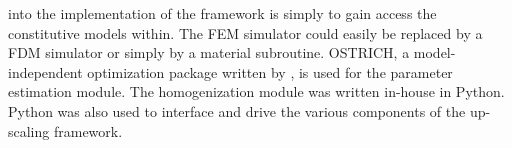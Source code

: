 into the implementation of the framework is simply to gain access the constitutive models within.  The FEM simulator could easily be replaced by a FDM simulator or simply by a material subroutine.  OSTRICH, a model-independent optimization package written by \citet{matott_ostrich:_2016}, is used for the parameter estimation module. The homogenization module was written in-house in Python. Python was also used to interface and drive the various components of the up-scaling framework. 





